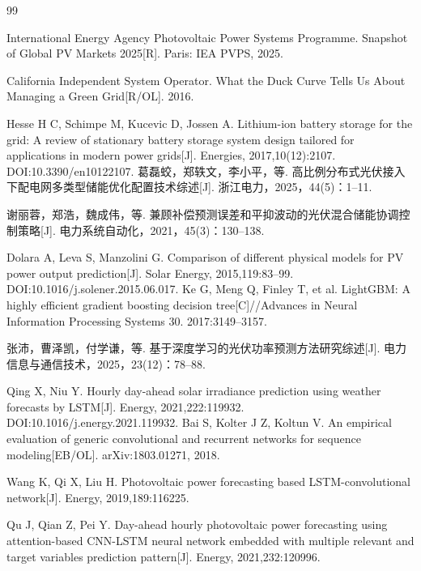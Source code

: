 \documentclass[12pt,a4paper]{ctexbook}
\begin{document}
\begin{thebibliography}{99}

International Energy Agency Photovoltaic Power Systems Programme. Snapshot of Global PV Markets 2025[R]. Paris: IEA PVPS, 2025.

California Independent System Operator. What the Duck Curve Tells Us About Managing a Green Grid[R/OL]. 2016.

Hesse H C, Schimpe M, Kucevic D, Jossen A. Lithium-ion battery storage for the grid: A review of stationary battery storage system design tailored for applications in modern power grids[J]. Energies, 2017,10(12):2107. DOI:10.3390/en10122107.
葛磊蛟，郑轶文，李小平，等. 高比例分布式光伏接入下配电网多类型储能优化配置技术综述[J]. 浙江电力，2025，44(5)：1--11.

谢丽蓉，郑浩，魏成伟，等. 兼顾补偿预测误差和平抑波动的光伏混合储能协调控制策略[J]. 电力系统自动化，2021，45(3)：130--138.

Dolara A, Leva S, Manzolini G. Comparison of different physical models for PV power output prediction[J]. Solar Energy, 2015,119:83--99. DOI:10.1016/j.solener.2015.06.017.
Ke G, Meng Q, Finley T, et al. LightGBM: A highly efficient gradient boosting decision tree[C]//Advances in Neural Information Processing Systems 30. 2017:3149--3157.

张沛，曹泽凯，付学谦，等. 基于深度学习的光伏功率预测方法研究综述[J]. 电力信息与通信技术，2025，23(12)：78--88.

Qing X, Niu Y. Hourly day-ahead solar irradiance prediction using weather forecasts by LSTM[J]. Energy, 2021,222:119932. DOI:10.1016/j.energy.2021.119932.
Bai S, Kolter J Z, Koltun V. An empirical evaluation of generic convolutional and recurrent networks for sequence modeling[EB/OL]. arXiv:1803.01271, 2018.

Wang K, Qi X, Liu H. Photovoltaic power forecasting based LSTM-convolutional network[J]. Energy, 2019,189:116225.

Qu J, Qian Z, Pei Y. Day-ahead hourly photovoltaic power forecasting using attention-based CNN-LSTM neural network embedded with multiple relevant and target variables prediction pattern[J]. Energy, 2021,232:120996.


\end{thebibliography}
\end{document}
